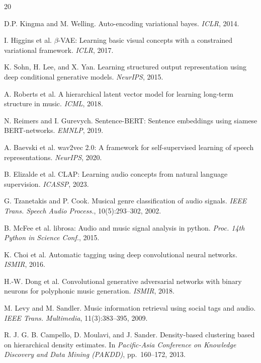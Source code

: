 \documentclass{article}
\begin{document}
\clearpage

\begin{thebibliography}{20}

D.P. Kingma and M. Welling.
\newblock Auto-encoding variational bayes.
\newblock \textit{ICLR}, 2014.

I. Higgins et al.
\newblock $\beta$-VAE: Learning basic visual concepts with a constrained variational framework.
\newblock \textit{ICLR}, 2017.

K. Sohn, H. Lee, and X. Yan.
\newblock Learning structured output representation using deep conditional generative models.
\newblock \textit{NeurIPS}, 2015.

A. Roberts et al.
\newblock A hierarchical latent vector model for learning long-term structure in music.
\newblock \textit{ICML}, 2018.

N. Reimers and I. Gurevych.
\newblock Sentence-BERT: Sentence embeddings using siamese BERT-networks.
\newblock \textit{EMNLP}, 2019.

A. Baevski et al.
\newblock wav2vec 2.0: A framework for self-supervised learning of speech representations.
\newblock \textit{NeurIPS}, 2020.

B. Elizalde et al.
\newblock CLAP: Learning audio concepts from natural language supervision.
\newblock \textit{ICASSP}, 2023.

G. Tzanetakis and P. Cook.
\newblock Musical genre classification of audio signals.
\newblock \textit{IEEE Trans. Speech Audio Process.}, 10(5):293--302, 2002.

B. McFee et al.
\newblock librosa: Audio and music signal analysis in python.
\newblock \textit{Proc. 14th Python in Science Conf.}, 2015.

K. Choi et al.
\newblock Automatic tagging using deep convolutional neural networks.
\newblock \textit{ISMIR}, 2016.

H.-W. Dong et al.
\newblock Convolutional generative adversarial networks with binary neurons for polyphonic music generation.
\newblock \textit{ISMIR}, 2018.

M. Levy and M. Sandler.
\newblock Music information retrieval using social tags and audio.
\newblock \textit{IEEE Trans. Multimedia}, 11(3):383--395, 2009.

R. J. G. B. Campello, D. Moulavi, and J. Sander.
\newblock Density-based clustering based on hierarchical density estimates.
\newblock In \textit{Pacific-Asia Conference on Knowledge Discovery and Data Mining (PAKDD)}, pp.\ 160--172, 2013.

\end{thebibliography}
\end{document}
